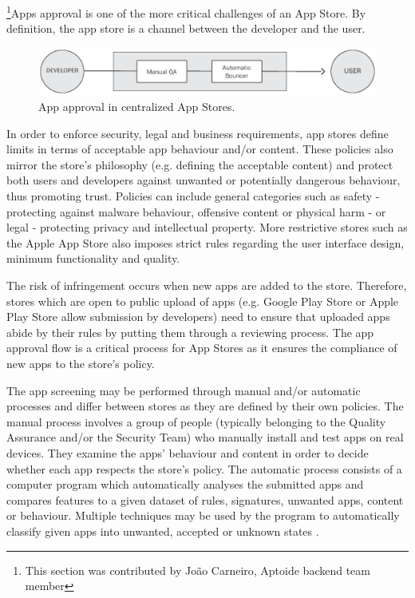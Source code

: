 \footnote{This section was contributed by Jo\~ao Carneiro, Aptoide backend team member}Apps approval is one of the more critical challenges of an App Store. By definition, the app store is a channel between the developer and the user.

\begin{figure}[!ht]
\centering
\includegraphics[width=\textwidth]{diagrams/apps_approval_flow.eps}
\caption{App approval in centralized App Stores.}
\label{fig:app_approval_flow}
\end{figure}

In order to enforce security, legal and business requirements, app stores define limits in terms of acceptable app behaviour and/or content. These policies also mirror the store's philosophy (e.g. defining the acceptable content) and protect both users and developers against unwanted or potentially dangerous behaviour, thus promoting trust. Policies can include general categories such as safety - protecting against malware behaviour, offensive content or physical harm - or legal - protecting privacy and intellectual property. More restrictive stores such as the Apple App Store also imposes strict rules regarding the user interface design, minimum functionality and quality. \cite{GooglePolicyWebsite} \cite{ApplePolicyWebsite}


The risk of infringement occurs when new apps are added to the store. Therefore, stores which are open to public upload of apps (e.g. Google Play Store or Apple Play Store allow submission by developers) need to ensure that uploaded apps abide by their rules by putting them through a reviewing process. The app approval flow is a critical process for App Stores as it ensures the compliance of new apps to the store's policy.

The app screening may be performed through manual and/or automatic processes and differ between stores as they are defined by their own policies. The manual process involves a group of people (typically belonging to the Quality Assurance and/or the Security Team) who manually install and test apps on real devices. They examine the apps' behaviour and content in order to decide whether each app respects the store's policy. The automatic process consists of a computer program which automatically analyses the submitted apps and compares features to a given dataset of rules, signatures, unwanted apps, content or behaviour. Multiple techniques may be used by the program to automatically classify given apps into unwanted, accepted or unknown states \cite{Bhattacharya2017}.

